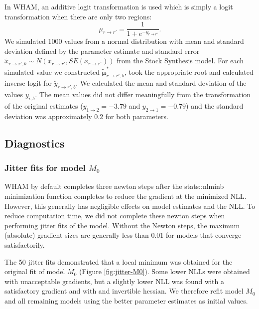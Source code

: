 \documentclass[
]{article}
\begin{document}
In WHAM, an additive logit transformation is used which is simply a
logit transformation when there are only two regions: \[
\mu_{r\rightarrow r'} = \frac{1}{1+e^{-y_{r\rightarrow r'}}}.
\] We simulated 1000 values from a normal distribution with mean and
standard deviation defined by the parameter estimate and standard error
\(\tilde x_{{r\rightarrow r'},b} \sim N(x_{r\rightarrow r'}, SE(x_{r\rightarrow r'}))\)
from the Stock Synthesis model. For each simulated value we constructed
\(\tilde {\boldsymbol{\mu}}^*_{{r\rightarrow r'},b}\), took the
appropriate root and calculated inverse logit for
\(\tilde y_{{r\rightarrow r'},b}\). We calculated the mean and standard
deviation of the values \(y_{i,b}\). The mean values did not differ
meaningfully from the transformation of the original estimates
(\(y_{1\rightarrow 2} = -3.79\) and \(y_{2\rightarrow 1} = -0.79\)) and
the standard deviation was approximately 0.2 for both parameters.

\hypertarget{diagnostics}{%
\subsection*{Diagnostics}\label{diagnostics}}

\hypertarget{jitter-fits-for-model-m_0}{%
\subsubsection{\texorpdfstring{Jitter fits for model
\(M_0\)}{Jitter fits for model M\_0}}\label{jitter-fits-for-model-m_0}}

WHAM by default completes three newton steps after the stats::nlminb
minimization function completes to reduce the gradient at the minimized
NLL. However, this generally has negligible effects on model estimates
and the NLL. To reduce computation time, we did not complete these
newton steps when performing jitter fits of the model. Without the
Newton steps, the maximum (absolute) gradient sizes are generally less
than 0.01 for models that converge satisfactorily.

The 50 jitter fits demonstrated that a local minimum was obtained for
the original fit of model \(M_0\) (Figure \ref{fig:jitter-M0}). Some
lower NLLs were obtained with unacceptable gradients, but a slightly
lower NLL was found with a satisfactory gradient and with and invertible
hessian. We therefore refit model \(M_0\) and all remaining models using
the better parameter estimates as initial values.
\end{document}
